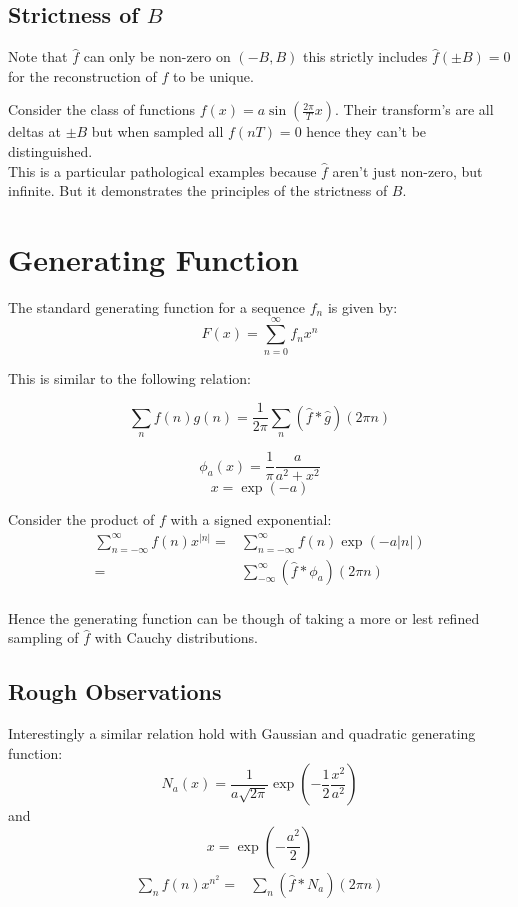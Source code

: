 \documentclass[12pt]{report}
\begin{document}
\subsection{Strictness of $B$}
Note that $\hat{f}$ can only be non-zero on $(-B,B)$ this strictly includes $\hat{f}(\pm B) = 0$ for the reconstruction of $f$ to be unique.

Consider the class of functions $f(x) = a\sin\left(\frac{2\pi}{T}x\right)$.
Their transform's are all deltas at $\pm B$ but when sampled all $f(nT) = 0$ hence they can't be distinguished.
\\

This is a particular pathological examples because $\hat{f}$ aren't just non-zero, but infinite. 
But it demonstrates the principles of the strictness of $B$.

\section{Generating Function}
The standard generating function for a sequence $f_n$ is given by:
\[F(x) = \sum_{n = 0}^{\infty}f_nx^n\]

This is similar to the following relation:

\[\sum_n f(n)g(n) = \frac{1}{2\pi}\sum_n (\hat{f} \ast \hat{g})(2\pi n)\]

\[\phi_a(x) = \frac{1}{\pi}\frac{a}{a^2+x^2}\]
\[x = \exp(-a) \]

Consider the product of $f$ with a signed exponential:
\begin{equation*}
\begin{aligned}
	\sum_{n = -\infty}^{\infty} f(n)x^{|n|} =& \sum_{n = -\infty}^{\infty} f(n)\exp(-a|n|) \\
	= & \sum_{-\infty}^{\infty} (\hat{f}\ast\phi_a)(2\pi n) \\
\end{aligned}
\end{equation*}

Hence the generating function can be though of taking a more or lest refined sampling of $\hat{f}$ with Cauchy distributions. 

\subsection{Rough Observations}
Interestingly a similar relation hold with Gaussian and quadratic generating function:
\[N_a(x) = \frac{1}{a\sqrt{2\pi}}\exp\left(-\frac{1}{2}\frac{x^2}{a^2}\right)\]
and
\[x = \exp\left(-\frac{a^2}{2}\right)\]
\begin{equation*}
\begin{aligned}
	\sum_n f(n) x^{n^2} =& \sum_n (\hat{f} \ast N_a)(2\pi n) \\
\end{aligned}
\end{equation*}
\\
\end{document}
